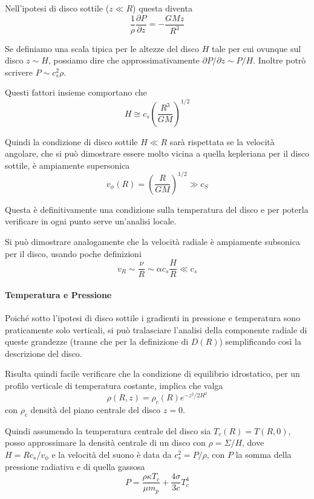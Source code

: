 \documentclass[a4paperbi]{article}
\begin{document}
	Nell'ipotesi di disco sottile ($z\ll R$) questa diventa
	\begin{equation}
		\frac{1}{\rho}\frac{\partial P}{\partial z}=-\frac{GMz}{R^3}
	\end{equation}
	
	Se definiamo una scala tipica per le altezze del disco $H$ tale per cui ovunque sul disco $z\sim H$, possiamo dire che approssimativamente $\partial P/\partial z\sim P/H$. Inoltre potrò scrivere $P\sim c_s^2\rho$.

	Questi fattori insieme comportano che
	\begin{equation}
		H\cong c_s\left(\frac{R^3}{GM}\right)^{1/2}
	\end{equation}

	Quindi la condizione di disco sottile $H\ll R$ sarà rispettata se la velocità angolare, che si può dimostrare essere molto vicina a quella kepleriana per il disco sottile, è ampiamente supersonica
	\begin{equation}
		v_\phi(R)=\left(\frac{R}{GM}\right)^{1/2}\gg c_S
	\end{equation}

	Questa è definitivamente una condizione sulla temperatura del disco e per poterla verificare in ogni punto serve un'analisi locale.
	
	Si può dimostrare analogamente che la velocità radiale è ampiamente subsonica per il disco, usando poche definizioni
	\begin{equation}
		v_R\sim\frac{\nu}{R}\sim\alpha c_s\frac{H}{R}\ll c_s
	\end{equation}
	
	\paragraph{Temperatura e Pressione} Poiché sotto l'ipotesi di disco sottile i gradienti in pressione e temperatura sono praticamente solo verticali, si può tralasciare l'analisi della componente radiale di queste grandezze (tranne che per la definizione di $D(R)$) semplificando così la descrizione del disco.
	
	Risulta quindi facile verificare che la condizione di equilibrio idrostatico, per un profilo verticale di temperatura costante, implica che valga
	\begin{equation*}
		\rho(R,z)=\rho_c(R)e^{-z^2/2H^2}
	\end{equation*}
	con $\rho_c$ densità del piano centrale del disco $z=0$.
	
	Quindi assumendo la temperatura centrale del disco sia $T_c(R)=T(R,0)$, posso approssimare la densità centrale di un disco con $\rho=\Sigma/H$, dove \\$H=Rc_s/v_\phi$ e la velocità del suono è data da $c_s^2=P/\rho$, con $P$ la somma della pressione radiativa e di quella gassosa
	\begin{equation}
		P=\frac{\rho\kappa T_c}{\mu m_p}+\frac{4\sigma}{3c}T_c^4
	\end{equation}
	
\end{document}
